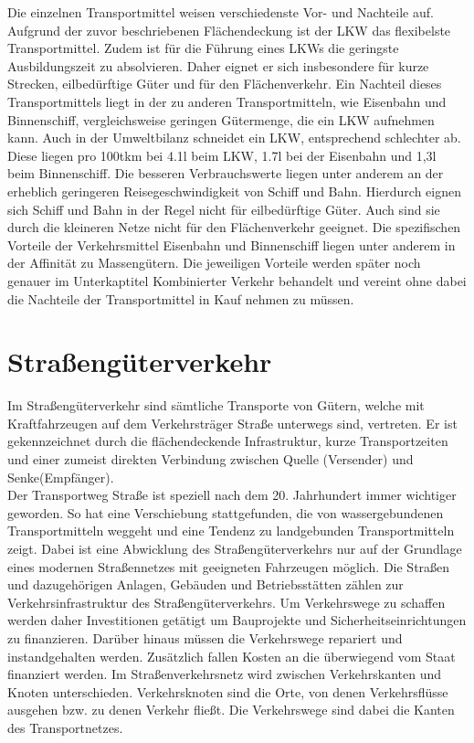 \documentclass[a4paper,12pt]{scrreprt}
\begin{document}
	Die einzelnen Transportmittel weisen verschiedenste Vor- und Nachteile auf. Aufgrund der zuvor beschriebenen Flächendeckung ist der LKW das flexibelste Transportmittel. Zudem ist für die Führung eines LKWs die geringste Ausbildungszeit zu absolvieren. Daher eignet er sich insbesondere für kurze Strecken, eilbedürftige Güter und für den Flächenverkehr. Ein Nachteil dieses Transportmittels liegt in der zu anderen Transportmitteln, wie Eisenbahn und Binnenschiff, vergleichsweise  geringen Gütermenge, die ein LKW aufnehmen kann. Auch in der Umweltbilanz schneidet ein LKW, entsprechend schlechter ab. Diese liegen pro 100tkm bei 4.1l beim LKW, 1.7l bei der Eisenbahn und 1,3l beim Binnenschiff. Die besseren Verbrauchswerte liegen unter anderem an der erheblich geringeren Reisegeschwindigkeit von Schiff und Bahn. Hierdurch eignen sich Schiff und Bahn in der Regel nicht für eilbedürftige Güter. Auch sind sie durch die kleineren Netze nicht für den Flächenverkehr geeignet. Die spezifischen Vorteile der Verkehrsmittel Eisenbahn und Binnenschiff liegen unter anderem in der Affinität zu Massengütern. Die jeweiligen Vorteile werden später noch genauer im Unterkaptitel Kombinierter Verkehr behandelt und vereint ohne dabei die Nachteile der Transportmittel in Kauf nehmen zu müssen.
	\section{Straßengüterverkehr}
	Im Straßengüterverkehr sind sämtliche Transporte von Gütern, welche mit Kraftfahrzeugen auf dem Verkehrsträger Straße unterwegs sind, vertreten. Er ist gekennzeichnet durch die flächendeckende Infrastruktur, kurze Transportzeiten und einer zumeist direkten Verbindung zwischen Quelle (Versender) und Senke(Empfänger).\\
	
	Der Transportweg Straße ist speziell nach dem 20. Jahrhundert immer wichtiger geworden. So hat eine Verschiebung stattgefunden, die von wassergebundenen Transportmitteln weggeht und eine Tendenz zu landgebunden Transportmitteln zeigt. Dabei ist eine Abwicklung des Straßengüterverkehrs nur auf der Grundlage eines modernen Straßennetzes mit geeigneten Fahrzeugen möglich. Die Straßen und dazugehörigen Anlagen, Gebäuden und Betriebsstätten zählen zur Verkehrsinfrastruktur des Straßengüterverkehrs. Um Verkehrswege zu schaffen werden daher Investitionen getätigt um Bauprojekte und Sicherheitseinrichtungen zu finanzieren. Darüber hinaus müssen die Verkehrswege repariert und instandgehalten werden. Zusätzlich fallen Kosten an die überwiegend vom Staat finanziert werden. Im Straßenverkehrsnetz wird zwischen Verkehrskanten und Knoten unterschieden. Verkehrsknoten sind die Orte, von denen Verkehrsflüsse ausgehen bzw. zu denen Verkehr fließt. Die Verkehrswege sind dabei die Kanten des Transportnetzes.\\
	
\end{document}
